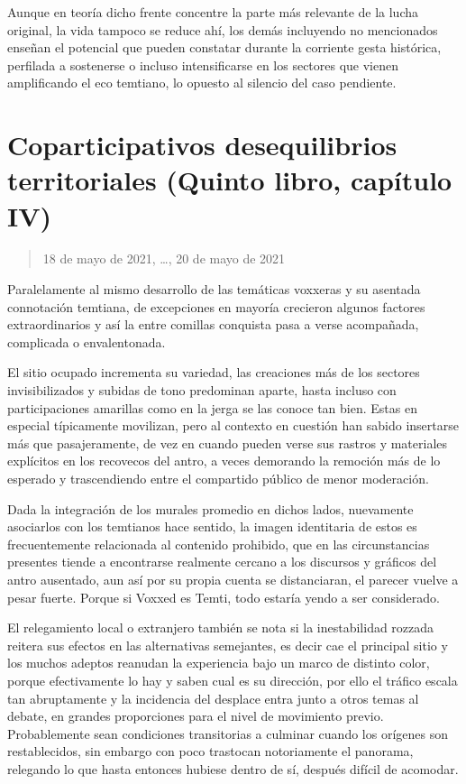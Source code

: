 \documentclass[
]{book}
\begin{document}
Aunque en teoría dicho frente concentre la parte más relevante de la lucha original, la vida tampoco se reduce ahí, los demás incluyendo no mencionados enseñan el potencial que pueden constatar durante la corriente gesta histórica, perfilada a sostenerse o incluso intensificarse en los sectores que vienen amplificando el eco temtiano, lo opuesto al silencio del caso pendiente.

\hypertarget{coparticipativos-desequilibrios-territoriales-quinto-libro-capuxedtulo-iv}{%
\section{Coparticipativos desequilibrios territoriales (Quinto libro, capítulo IV)}\label{coparticipativos-desequilibrios-territoriales-quinto-libro-capuxedtulo-iv}}

\begin{quote}
18 de mayo de 2021, \ldots, 20 de mayo de 2021
\end{quote}

Paralelamente al mismo desarrollo de las temáticas voxxeras y su asentada connotación temtiana, de excepciones en mayoría crecieron algunos factores extraordinarios y así la entre comillas conquista pasa a verse acompañada, complicada o envalentonada.

El sitio ocupado incrementa su variedad, las creaciones más de los sectores invisibilizados y subidas de tono predominan aparte, hasta incluso con participaciones amarillas como en la jerga se las conoce tan bien. Estas en especial típicamente movilizan, pero al contexto en cuestión han sabido insertarse más que pasajeramente, de vez en cuando pueden verse sus rastros y materiales explícitos en los recovecos del antro, a veces demorando la remoción más de lo esperado y trascendiendo entre el compartido público de menor moderación.

Dada la integración de los murales promedio en dichos lados, nuevamente asociarlos con los temtianos hace sentido, la imagen identitaria de estos es frecuentemente relacionada al contenido prohibido, que en las circunstancias presentes tiende a encontrarse realmente cercano a los discursos y gráficos del antro ausentado, aun así por su propia cuenta se distanciaran, el parecer vuelve a pesar fuerte. Porque si Voxxed es Temti, todo estaría yendo a ser considerado.

El relegamiento local o extranjero también se nota si la inestabilidad rozzada reitera sus efectos en las alternativas semejantes, es decir cae el principal sitio y los muchos adeptos reanudan la experiencia bajo un marco de distinto color, porque efectivamente lo hay y saben cual es su dirección, por ello el tráfico escala tan abruptamente y la incidencia del desplace entra junto a otros temas al debate, en grandes proporciones para el nivel de movimiento previo. Probablemente sean condiciones transitorias a culminar cuando los orígenes son restablecidos, sin embargo con poco trastocan notoriamente el panorama, relegando lo que hasta entonces hubiese dentro de sí, después difícil de acomodar.
\end{document}
